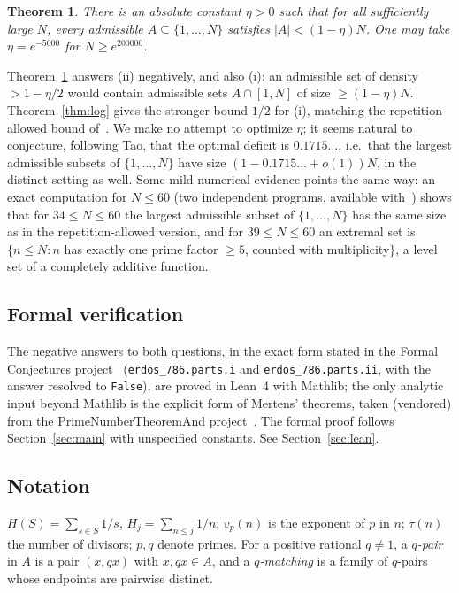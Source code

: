 \documentclass[11pt]{amsart}
\newtheorem{theorem}{Theorem}
\theoremstyle{definition}
\theoremstyle{remark}
\newcommand{\abs}[1]{\lvert #1\rvert}
\begin{document}
\begin{theorem}\label{thm:main}
There is an absolute constant $\eta>0$ such that for all sufficiently large $N$, every admissible $A\subseteq\{1,\dots,N\}$ satisfies $\abs{A}<(1-\eta)N$. One may take $\eta=e^{-5000}$ for $N\ge e^{200000}$.
\end{theorem}

Theorem~\ref{thm:main} answers (ii) negatively, and also (i): an admissible set of density $>1-\eta/2$ would contain admissible sets $A\cap[1,N]$ of size $\ge(1-\eta)N$. Theorem~\ref{thm:log} gives the stronger bound $1/2$ for (i), matching the repetition-allowed bound of~\cite{ERS73}. We make no attempt to optimize $\eta$; it seems natural to conjecture, following Tao, that the optimal deficit is $0.1715\ldots$, i.e.\ that the largest admissible subsets of $\{1,\dots,N\}$ have size $(1-0.1715\ldots+o(1))N$, in the distinct setting as well. Some mild numerical evidence points the same way: an exact computation for $N\le60$ (two independent programs, available with~\cite{repo}) shows that for $34\le N\le60$ the largest admissible subset of $\{1,\dots,N\}$ has the same size as in the repetition-allowed version, and for $39\le N\le 60$ an extremal set is $\{n\le N: n$ has exactly one prime factor $\ge5$, counted with multiplicity$\}$, a level set of a completely additive function.

\subsection*{Formal verification}
The negative answers to both questions, in the exact form stated in the Formal Conjectures project~\cite{FC} (\texttt{erdos\_786.parts.i} and \texttt{erdos\_786.parts.ii}, with the answer resolved to \texttt{False}), are proved in Lean~4 with Mathlib; the only analytic input beyond Mathlib is the explicit form of Mertens' theorems, taken (vendored) from the PrimeNumberTheoremAnd project~\cite{PNT}. The formal proof follows Section~\ref{sec:main} with unspecified constants. See Section~\ref{sec:lean}.

\subsection*{Notation}
$H(S)=\sum_{s\in S}1/s$, $H_j=\sum_{n\le j}1/n$; $v_p(n)$ is the exponent of $p$ in $n$; $\tau(n)$ the number of divisors; $p,q$ denote primes. For a positive rational $q\ne1$, a \emph{$q$-pair} in $A$ is a pair $(x,qx)$ with $x,qx\in A$, and a \emph{$q$-matching} is a family of $q$-pairs whose endpoints are pairwise distinct.
\end{document}
